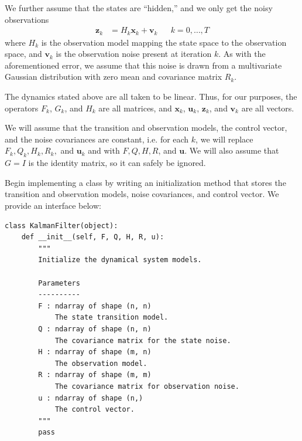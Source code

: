 We further assume that the states are ``hidden,'' and we only get the noisy observations
\begin{align}
\mathbf{z}_{k} &= H_{k}\mathbf{x}_{k} + \mathbf{v}_{k} && k = 0, \dots, T
\label{eq:obs}
\end{align}
where $H_{k}$ is the observation model mapping the state space to the observation space, and $\mathbf{v}_{k}$ is the observation noise present at iteration $k$.
As with the aforementioned error, we assume that this noise is drawn from a multivariate Gaussian distribution with zero mean and covariance matrix $R_{k}$.

The dynamics stated above are all taken to be linear.
Thus, for our purposes, the operators $F_k$, $G_k$, and $H_k$ are all matrices, and $\mathbf{x}_k$, $\mathbf{u}_k$, $\mathbf{z}_k$, and $\mathbf{v}_k$ are all vectors.

We will assume that the transition and observation models, the control vector, and the noise covariances are constant, i.e. for each $k$, we will replace $F_{k}, Q_{k}, H_k, R_{k},$ and $\mathbf{u}_{k}$ and with $F, Q, H, R$, and $\mathbf{u}$.
We will also assume that $G = I$ is the identity matrix, so it can safely be ignored.

\begin{problem}
Begin implementing a  class by writing an initialization method that stores the transition and observation models, noise covariances, and control vector.
We provide an interface below:
\begin{lstlisting}
class KalmanFilter(object):
    def __init__(self, F, Q, H, R, u):
        """
        Initialize the dynamical system models.

        Parameters
        ----------
        F : ndarray of shape (n, n)
            The state transition model.
        Q : ndarray of shape (n, n)
            The covariance matrix for the state noise.
        H : ndarray of shape (m, n)
            The observation model.
        R : ndarray of shape (m, m)
            The covariance matrix for observation noise.
        u : ndarray of shape (n,)
            The control vector.
        """
        pass
\end{lstlisting}
\end{problem}

